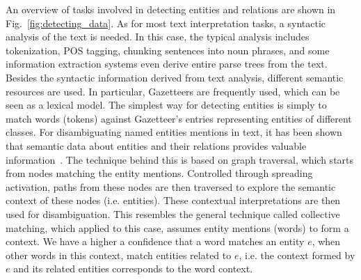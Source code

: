 An overview of tasks involved in detecting entities and relations are shown in Fig.~\ref{fig:detecting_data}. As for most text interpretation tasks, a syntactic analysis of the text is needed. In this case, the typical analysis includes tokenization, POS tagging, chunking sentences into noun phrases, and some information extraction systems even derive entire parse trees from the text. Besides the syntactic information derived from text analysis, different semantic resources are used. In particular, Gazetteers are frequently used, which can be seen as a lexical model. The simplest way for detecting entities is simply to match words (tokens) against Gazetteer's entries representing entities of different classes. For disambiguating named entities mentions in text, it has been shown that semantic data about entities and their relations provides valuable information~\cite{DBLP:conf/esws/KlebA10}. The technique behind this is based on graph traversal, which starts from nodes matching the entity mentions. Controlled through spreading activation, paths from these nodes are then traversed to explore the semantic context of these nodes (i.e. entities). These contextual interpretations are then used for disambiguation. This resembles the general technique called collective matching, which applied to this case, assumes entity mentions (words) to form a context. We have a higher a confidence that a word matches an entity $e$, when other words in this context, match entities related to $e$, i.e. the context formed by $e$ and its related entities corresponds to the word context. 

